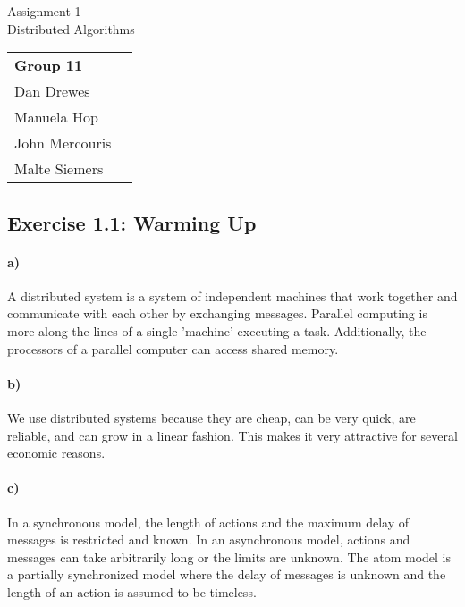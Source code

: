 \documentclass[12pt,a4paper]{article}
\begin{document}
\begin{center}
\Large Assignment 1\\
\large Distributed Algorithms
\end{center}
\begin{flushright}
\begin{tabular}{ll}
	\textbf{Group 11} \\
	Dan Drewes     	  \\ 
	Manuela Hop       \\ 
	John Mercouris    \\
	Malte Siemers     \\
\end{tabular} 
\end{flushright}

\subsection*{Exercise 1.1: Warming Up}
\paragraph*{a)} %
A distributed system is a system of independent machines that work together and communicate with each other by exchanging messages. Parallel computing is more along the lines of a single 'machine' executing a task. Additionally, the processors of a parallel computer can access shared memory.
\paragraph{b)} %
We use distributed systems because they are cheap, can be very quick, are reliable, and can grow in a linear fashion. This makes it very attractive for several economic reasons. 
\paragraph{c)} %
In a synchronous model, the length of actions and the maximum delay of messages is restricted and known. In an asynchronous model, actions and messages can take arbitrarily long or the limits are unknown. The atom model is a partially synchronized model where the delay of messages is unknown and the length of an action is assumed to be timeless.
\end{document}
